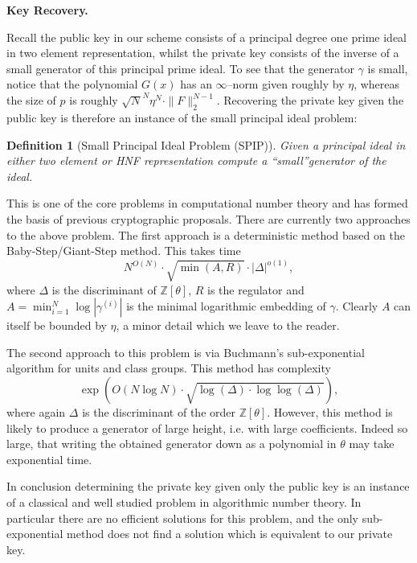 \documentclass[a4paper, 12pt]{article}
\newtheorem{definition}{Definition}
\newcommand{\ndash}{\nobreakdash --}
\newcommand{\bb}[1]{\mathbb{#1}}
\newcommand{\tfr}[1]{\textfrak{#1}}
\newcommand{\tbf}[1]{\textbf{#1}}
\newenvironment{bparagraph}[1]{
	\vspace{2ex}\noindent\tbf{#1. }\nolinebreak 
}{\vspace{2ex}}
\begin{document}
	\begin{bparagraph}{Key Recovery}
		Recall the public key in our scheme consists of a principal degree one prime ideal in two element representation, whilst the private key consists of the inverse of a small generator of this principal prime ideal. 
		To see that the generator $\gamma$ is small, notice that the polynomial $G(x)$ has an $\infty$\ndash norm given roughly by $\eta$, whereas the size of $p$ is roughly $\sqrt{N}^N \eta ^ N \cdot \|F\|^{N - 1}_2$. 
		Recovering the private key given the public key is therefore an instance of the small principal ideal problem:
		
		\begin{definition}[Small Principal Ideal Problem (SPIP)]
			Given a principal ideal \tfr{a} in either two element or HNF representation compute a \textquotedblleft small\textquotedblright generator of the ideal.
		\end{definition}
		
		This is one of the core problems in computational number theory and has formed the basis of previous cryptographic proposals. There are currently two approaches to the above problem.
		The first approach is a deterministic method based on the Baby-Step/Giant-Step method.
		This takes time
		\[N^{O(N)} \cdot \sqrt{\min{(A, R)}} \cdot |\Delta|^{o(1)},\]
		where $\Delta$ is the discriminant of $\bb{Z}[\theta]$, $R$ is the regulator and $A = \min^{N}_{i=1} \log{|\gamma^{(i)}|}$ is the minimal logarithmic embedding of $\gamma$. 
		Clearly $A$ can itself be bounded by $\eta$, a minor detail which we leave to the reader.
		
		The second approach to this problem is via Buchmann's sub-exponential algorithm for units and class groups.
		This method has complexity
		\[
		\exp{\left(O(N \log N) \cdot \sqrt{\log{(\Delta)} \cdot \log{\log{(\Delta)}}} \right)},
		\]
		where again $\Delta$ is the discriminant of the order $\bb{Z}[\theta]$.
		However, this method is	likely to produce a generator of large height, i.e. with large coefficients.
		Indeed so large, that writing the obtained generator down as a polynomial in $\theta$ may take exponential time.
		
		In conclusion determining the private key given only the public key is an instance of a classical and well studied problem in algorithmic number theory.
		In particular there are no efficient solutions for this problem, and the only sub-exponential method does not find a solution which is equivalent to our private key.
		
	\end{bparagraph}
	
\end{document}
